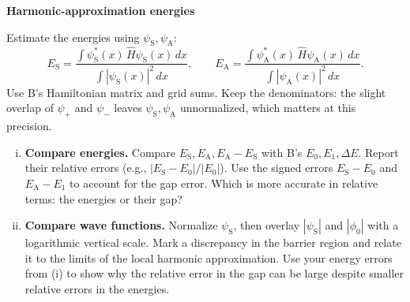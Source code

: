 \begin{problem}[10]
  \textbf{Harmonic-approximation energies}

  Estimate the energies using $\psi_\mathrm{S},\psi_\mathrm{A}$:
  \begin{equation}
    E_\mathrm{S} = \frac{\int \psi_\mathrm{S}^*(x)\, \hat H \psi_\mathrm{S}(x)\, dx}{\int |\psi_\mathrm{S}(x)|^2\, dx}, \qquad
    E_\mathrm{A} = \frac{\int \psi_\mathrm{A}^*(x)\, \hat H \psi_\mathrm{A}(x)\, dx}{\int |\psi_\mathrm{A}(x)|^2\, dx}.
  \end{equation}
  Use B's Hamiltonian matrix and grid sums.
  Keep the denominators: the slight overlap of $\psi_+$ and $\psi_-$ leaves $\psi_\mathrm{S},\psi_\mathrm{A}$ unnormalized, which matters at this precision.

  \begin{enumerate}[(i)]
    \item \textbf{Compare energies.} Compare $E_\mathrm{S},E_\mathrm{A},E_\mathrm{A}-E_\mathrm{S}$ with B's $E_0,E_1,\Delta E$.
          Report their relative errors (e.g., $|E_\mathrm{S}-E_0|/|E_0|$).
          Use the signed errors $E_\mathrm{S}-E_0$ and $E_\mathrm{A}-E_1$ to account for the gap error.
          Which is more accurate in relative terms: the energies or their gap?
    \item \textbf{Compare wave functions.} Normalize $\psi_\mathrm{S}$, then overlay $|\psi_\mathrm{S}|$ and $|\phi_0|$ with a logarithmic vertical scale.
          Mark a discrepancy in the barrier region and relate it to the limits of the local harmonic approximation.
          Use your energy errors from (i) to show why the relative error in the gap can be large despite smaller relative errors in the energies.
  \end{enumerate}
\end{problem}

\begin{solution}
\end{solution}

